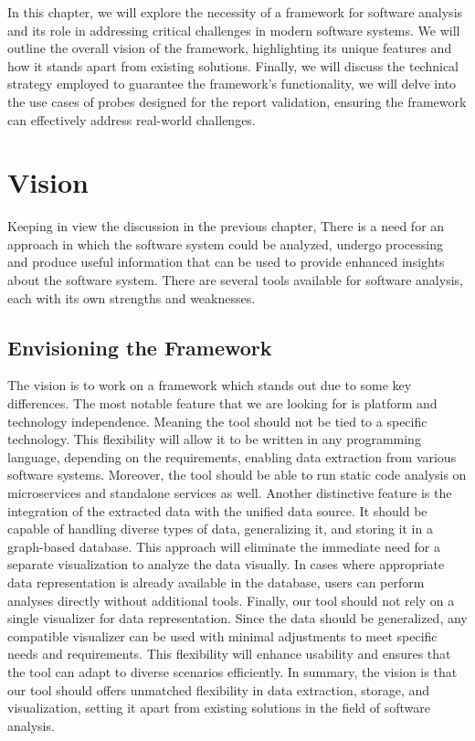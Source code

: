 In this chapter, we will explore the necessity of a framework for software analysis and its role in addressing critical challenges in modern software systems. We will outline the overall vision of the framework, highlighting its unique features and how it stands apart from existing solutions. Finally, we will discuss the technical strategy employed to guarantee the framework's functionality, we will delve into the use cases of probes designed for the report validation, ensuring the framework can effectively address real-world challenges.

\section{Vision}\label{sec:vision}

Keeping in view the discussion in the previous chapter, There is a need for an approach in which the software system could be analyzed, undergo processing and produce useful information that can be used to provide enhanced insights about the software system. There are several tools available for software analysis, each with its own strengths and weaknesses. 

\subsection{Envisioning the Framework}
The vision is to work on a framework which stands out due to some key differences. The most notable feature that we are looking for is platform and technology independence. Meaning the tool should not be tied to a specific technology. This flexibility will allow it to be written in any programming language, depending on the requirements, enabling data extraction from various software systems. Moreover, the tool should be able to run static code analysis on microservices and standalone services as well. Another distinctive feature is the integration of the extracted data with the unified data source. It should be capable of handling diverse types of data, generalizing it, and storing it in a graph-based database. This approach will eliminate the immediate need for a separate visualization to analyze the data visually. In cases where appropriate data representation is already available in the database, users can perform analyses directly without additional tools. Finally, our tool should not rely on a single visualizer for data representation. Since the data should be generalized, any compatible visualizer can be used with minimal adjustments to meet specific needs and requirements. This flexibility will enhance usability and ensures that the tool can adapt to diverse scenarios efficiently. In summary, the vision is that our tool should offers unmatched flexibility in data extraction, storage, and visualization, setting it apart from existing solutions in the field of software analysis.

